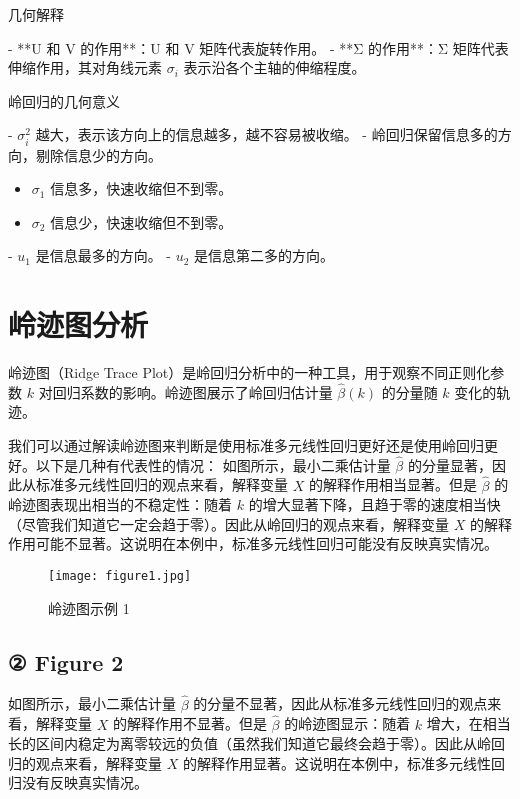 \documentclass[lang=cn,11pt,a4paper]{elegantpaper}
\begin{document}
    几何解释
    
    - **U 和 V 的作用**：U 和 V 矩阵代表旋转作用。
    - **Σ 的作用**：Σ 矩阵代表伸缩作用，其对角线元素 \(\sigma_i\) 表示沿各个主轴的伸缩程度。
    
    岭回归的几何意义
    
    - \(\sigma_i^2\) 越大，表示该方向上的信息越多，越不容易被收缩。
    - 岭回归保留信息多的方向，剔除信息少的方向。
    
    \begin{itemize}
        \item \(\sigma_1\) 信息多，快速收缩但不到零。
        \item \(\sigma_2\) 信息少，快速收缩但不到零。
    \end{itemize}
    
    - \(u_1\) 是信息最多的方向。
    - \(u_2\) 是信息第二多的方向。

    \section{岭迹图分析}

    岭迹图（Ridge Trace Plot）是岭回归分析中的一种工具，用于观察不同正则化参数 \(k\) 对回归系数的影响。岭迹图展示了岭回归估计量 \(\hat{\beta}(k)\) 的分量随 \(k\) 变化的轨迹。
    
    \par
    
    我们可以通过解读岭迹图来判断是使用标准多元线性回归更好还是使用岭回归更好。以下是几种有代表性的情况：    
    如图所示，最小二乘估计量 \(\hat{\beta}\) 的分量显著，因此从标准多元线性回归的观点来看，解释变量 \(X\) 的解释作用相当显著。但是 \(\hat{\beta}\) 的岭迹图表现出相当的不稳定性：随着 \(k\) 的增大显著下降，且趋于零的速度相当快（尽管我们知道它一定会趋于零）。因此从岭回归的观点来看，解释变量 \(X\) 的解释作用可能不显著。这说明在本例中，标准多元线性回归可能没有反映真实情况。
    
    \begin{figure}[h]
        \centering
        \texttt{[image: figure1.jpg]}
        \caption{岭迹图示例 1}
        \label{fig:figure1}
    \end{figure}
    
    \subsection*{② Figure 2}
    
    如图所示，最小二乘估计量 \(\hat{\beta}\) 的分量不显著，因此从标准多元线性回归的观点来看，解释变量 \(X\) 的解释作用不显著。但是 \(\hat{\beta}\) 的岭迹图显示：随着 \(k\) 增大，在相当长的区间内稳定为离零较远的负值（虽然我们知道它最终会趋于零）。因此从岭回归的观点来看，解释变量 \(X\) 的解释作用显著。这说明在本例中，标准多元线性回归没有反映真实情况。
    
\end{document}
